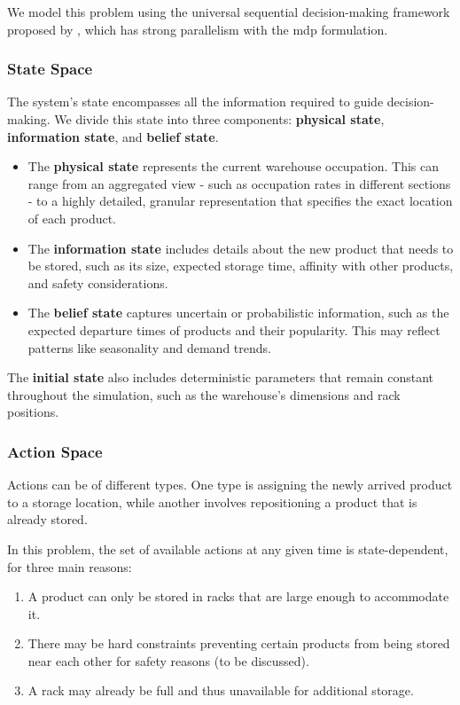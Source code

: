 \documentclass[a4paper,twoside,11pt]{article}
\begin{document}
We model this problem using the universal sequential decision-making framework proposed by \cite{Powell2022ReinforcementLA}, which has strong parallelism with the \gls{mdp} formulation.

\subsubsection*{State Space}

The system's state encompasses all the information required to guide decision-making. We divide this state into three components: \textbf{physical state}, \textbf{information state}, and \textbf{belief state}.

\begin{itemize}
    \item The \textbf{physical state} represents the current warehouse occupation. This can range from an aggregated view - such as occupation rates in different sections - to a highly detailed, granular representation that specifies the exact location of each product.

    \item The \textbf{information state} includes details about the new product that needs to be stored, such as its size, expected storage time, affinity with other products, and safety considerations.

    \item The \textbf{belief state} captures uncertain or probabilistic information, such as the expected departure times of products and their popularity. This may reflect patterns like seasonality and demand trends.
\end{itemize}

The \textbf{initial state} also includes deterministic parameters that remain constant throughout the simulation, such as the warehouse’s dimensions and rack positions.


\subsubsection*{Action Space}

Actions can be of different types. One type is assigning the newly arrived product to a storage location, while another involves repositioning a product that is already stored.

In this problem, the set of available actions at any given time is state-dependent, for three main reasons:
\begin{enumerate}
    \item A product can only be stored in racks that are large enough to accommodate it.
    \item There may be hard constraints preventing certain products from being stored near each other for safety reasons (to be discussed).
    \item A rack may already be full and thus unavailable for additional storage.
\end{enumerate}
\end{document}
